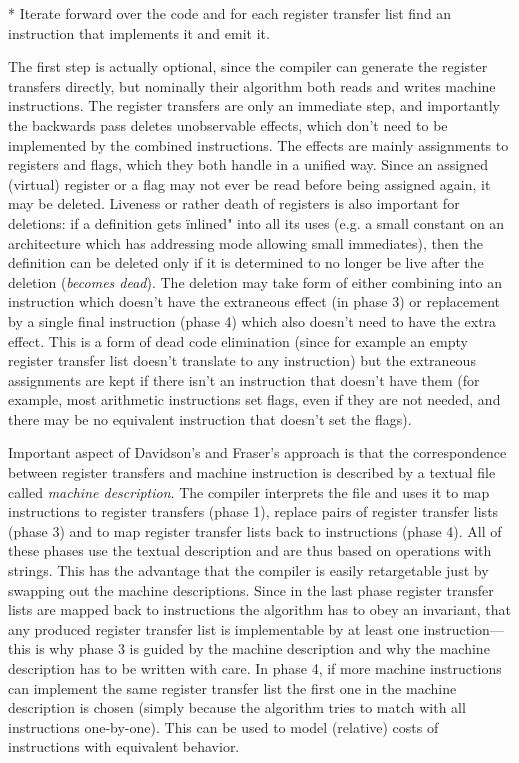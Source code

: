 * Iterate forward over the code and for each register transfer list find an
instruction that implements it and emit it.
\enditems

The first step is actually optional, since the compiler can generate the
register transfers directly, but nominally their algorithm both reads and writes
machine instructions. The register transfers are only an immediate step, and
importantly the backwards pass deletes unobservable effects, which don't need to
be implemented by the combined instructions. The effects are mainly assignments
to registers and flags, which they both handle in a unified way. Since an
assigned (virtual) register or a flag may not ever be read before being assigned
again, it may be deleted. Liveness or rather death of registers is also
important for deletions: if a definition gets \"inlined" into all its uses (e.g.
a small constant on an architecture which has addressing mode allowing small
immediates), then the definition can be deleted only if it is determined to no
longer be live after the deletion ({\em becomes dead}).
The deletion may take form of either combining into an
instruction which doesn't have the extraneous effect (in phase 3) or replacement
by a single final instruction (phase 4) which also doesn't need to have the
extra effect. This is a form of dead code elimination (since for example an
empty register transfer list doesn't translate to any instruction) but the
extraneous assignments are kept if there isn't an instruction that doesn't have
them (for example, most arithmetic instructions set flags, even if they are not
needed, and there may be no equivalent instruction that doesn't set the flags).

Important aspect of Davidson's and Fraser's approach is that the correspondence
between register transfers and machine instruction is described by a textual
file called {\em machine description}. The compiler interprets the file and uses
it to map instructions to register transfers (phase 1), replace pairs of
register transfer lists (phase 3) and to map register transfer lists back to
instructions (phase 4). All of these phases use the textual description and are
thus based on operations with strings. This has the advantage that the compiler
is easily retargetable just by swapping out the machine descriptions. Since in
the last phase register transfer lists are mapped back to instructions the
algorithm has to obey an invariant, that any produced register transfer list is
implementable by at least one instruction---this is why phase 3 is guided by the
machine description and why the machine description has to be written with care.
In phase 4, if more machine instructions can implement the same register
transfer list the first one in the machine description is chosen (simply because
the algorithm tries to match with all instructions one-by-one). This can be used
to model (relative) costs of instructions with equivalent behavior.

